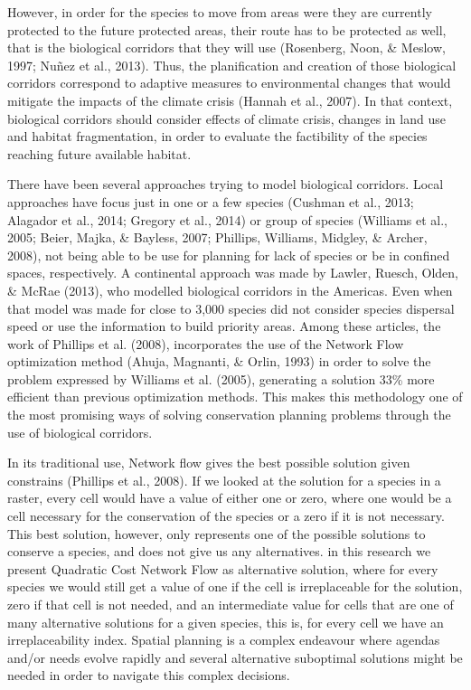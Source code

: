 \documentclass[]{article}
\begin{document}
However, in order for the species to move from areas were they are currently protected to the future protected areas, their route has to be protected as well, that is the biological corridors that they will use (Rosenberg, Noon, \& Meslow, 1997; Nuñez et al., 2013). Thus, the planification and creation of those biological corridors correspond to adaptive measures to environmental changes that would mitigate the impacts of the climate crisis (Hannah et al., 2007). In that context, biological corridors should consider effects of climate crisis, changes in land use and habitat fragmentation, in order to evaluate the factibility of the species reaching future available habitat.

There have been several approaches trying to model biological corridors. Local approaches have focus just in one or a few species (Cushman et al., 2013; Alagador et al., 2014; Gregory et al., 2014) or group of species (Williams et al., 2005; Beier, Majka, \& Bayless, 2007; Phillips, Williams, Midgley, \& Archer, 2008), not being able to be use for planning for lack of species or be in confined spaces, respectively. A continental approach was made by Lawler, Ruesch, Olden, \& McRae (2013), who modelled biological corridors in the Americas. Even when that model was made for close to 3,000 species did not consider species dispersal speed or use the information to build priority areas. Among these articles, the work of Phillips et al. (2008), incorporates the use of the Network Flow optimization method (Ahuja, Magnanti, \& Orlin, 1993) in order to solve the problem expressed by Williams et al. (2005), generating a solution 33\% more efficient than previous optimization methods. This makes this methodology one of the most promising ways of solving conservation planning problems through the use of biological corridors.

In its traditional use, Network flow gives the best possible solution given constrains (Phillips et al., 2008). If we looked at the solution for a species in a raster, every cell would have a value of either one or zero, where one would be a cell necessary for the conservation of the species or a zero if it is not necessary. This best solution, however, only represents one of the possible solutions to conserve a species, and does not give us any alternatives. in this research we present Quadratic Cost Network Flow as alternative solution, where for every species we would still get a value of one if the cell is irreplaceable for the solution, zero if that cell is not needed, and an intermediate value for cells that are one of many alternative solutions for a given species, this is, for every cell we have an irreplaceability index. Spatial planning is a complex endeavour where agendas and/or needs evolve rapidly and several alternative suboptimal solutions might be needed in order to navigate this complex decisions.
\end{document}
